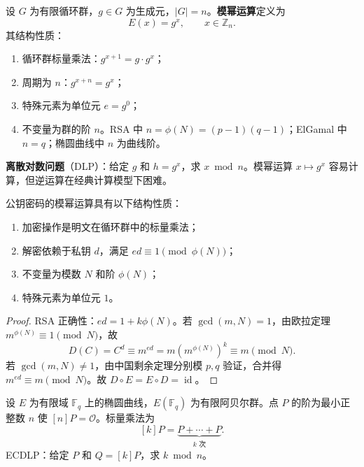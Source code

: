 \begin{definition}[模幂运算的周期结构]\label{def:modular_exponentiation_period}
设 \(G\) 为有限循环群，\(g\in G\) 为生成元，\(|G|=n\)。\textbf{模幂运算}定义为
\[
E(x)=g^x,\qquad x\in\mathbb Z_n.
\]
其结构性质：
\begin{enumerate}[label=(\roman*)]
    \item 循环群标量乘法：\(g^{x+1}=g\cdot g^x\)；
    \item 周期为 \(n\)：\(g^{x+n}=g^x\)；
    \item 特殊元素为单位元 \(e=g^0\)；
    \item 不变量为群的阶 \(n\)。RSA 中 \(n=\phi(N)=(p-1)(q-1)\)；ElGamal 中 \(n=q\)；椭圆曲线中 \(n\) 为曲线阶。
\end{enumerate}
\end{definition}

\begin{definition}[离散对数问题]\label{def:discrete_logarithm_problem}
\textbf{离散对数问题}（DLP）：给定 \(g\) 和 \(h=g^x\)，求 \(x\bmod n\)。模幂运算 \(x\mapsto g^x\) 容易计算，但逆运算在经典计算模型下困难。
\end{definition}

\begin{proposition}[公钥密码的结构性质]\label{prop:public_key_structure}
公钥密码的模幂运算具有以下结构性质：
\begin{enumerate}[label=(\roman*)]
    \item 加密操作是明文在循环群中的标量乘法；
    \item 解密依赖于私钥 \(d\)，满足 \(ed\equiv1\pmod{\phi(N)}\)；
    \item 不变量为模数 \(N\) 和阶 \(\phi(N)\)；
    \item 特殊元素为单位元 \(1\)。
\end{enumerate}
\end{proposition}

\begin{proof}
RSA 正确性：\(ed=1+k\phi(N)\)。若 \(\gcd(m,N)=1\)，由欧拉定理 \(m^{\phi(N)}\equiv1\pmod N\)，故
\[
D(C)=C^d\equiv m^{ed}=m(m^{\phi(N)})^k\equiv m\pmod N.
\]
若 \(\gcd(m,N)\neq1\)，由中国剩余定理分别模 \(p,q\) 验证，合并得 \(m^{ed}\equiv m\pmod N\)。故 \(D\circ E=E\circ D=\operatorname{id}\)。
\end{proof}

\begin{definition}[椭圆曲线的周期结构]\label{def:elliptic_curve_period}
设 \(E\) 为有限域 \(\mathbb F_q\) 上的椭圆曲线，\(E(\mathbb F_q)\) 为有限阿贝尔群。点 \(P\) 的阶为最小正整数 \(n\) 使 \([n]P=\mathcal O\)。标量乘法为
\[
[k]P=\underbrace{P+\cdots+P}_{k\text{ 次}}.
\]
ECDLP：给定 \(P\) 和 \(Q=[k]P\)，求 \(k\bmod n\)。
\end{definition}

